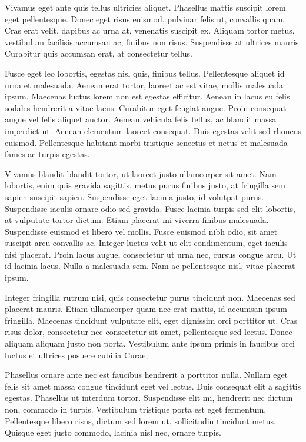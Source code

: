 \documentclass{amsbook}
\begin{document}
Vivamus eget ante quis tellus ultricies aliquet. Phasellus mattis suscipit lorem eget pellentesque. Donec eget risus euismod, pulvinar felis ut, convallis quam. Cras erat velit, dapibus ac urna at, venenatis suscipit ex. Aliquam tortor metus, vestibulum facilisis accumsan ac, finibus non risus. Suspendisse at ultrices mauris. Curabitur quis accumsan erat, at consectetur tellus.

Fusce eget leo lobortis, egestas nisl quis, finibus tellus. Pellentesque aliquet id urna et malesuada. Aenean erat tortor, laoreet ac est vitae, mollis malesuada ipsum. Maecenas luctus lorem non est egestas efficitur. Aenean in lacus eu felis sodales hendrerit a vitae lacus. Curabitur eget feugiat augue. Proin consequat augue vel felis aliquet auctor. Aenean vehicula felis tellus, ac blandit massa imperdiet ut. Aenean elementum laoreet consequat. Duis egestas velit sed rhoncus euismod. Pellentesque habitant morbi tristique senectus et netus et malesuada fames ac turpis egestas.

Vivamus blandit blandit tortor, ut laoreet justo ullamcorper sit amet. Nam lobortis, enim quis gravida sagittis, metus purus finibus justo, at fringilla sem sapien suscipit sapien. Suspendisse eget lacinia justo, id volutpat purus. Suspendisse iaculis ornare odio sed gravida. Fusce lacinia turpis sed elit lobortis, at vulputate tortor dictum. Etiam placerat mi viverra finibus malesuada. Suspendisse euismod et libero vel mollis. Fusce euismod nibh odio, sit amet suscipit arcu convallis ac. Integer luctus velit ut elit condimentum, eget iaculis nisi placerat. Proin lacus augue, consectetur ut urna nec, cursus congue arcu. Ut id lacinia lacus. Nulla a malesuada sem. Nam ac pellentesque nisl, vitae placerat ipsum.

Integer fringilla rutrum nisi, quis consectetur purus tincidunt non. Maecenas sed placerat mauris. Etiam ullamcorper quam nec erat mattis, id accumsan ipsum fringilla. Maecenas tincidunt vulputate elit, eget dignissim orci porttitor ut. Cras risus dolor, consectetur nec consectetur sit amet, pellentesque sed lectus. Donec aliquam aliquam justo non porta. Vestibulum ante ipsum primis in faucibus orci luctus et ultrices posuere cubilia Curae;

Phasellus ornare ante nec est faucibus hendrerit a porttitor nulla. Nullam eget felis sit amet massa congue tincidunt eget vel lectus. Duis consequat elit a sagittis egestas. Phasellus ut interdum tortor. Suspendisse elit mi, hendrerit nec dictum non, commodo in turpis. Vestibulum tristique porta est eget fermentum. Pellentesque libero risus, dictum sed lorem ut, sollicitudin tincidunt metus. Quisque eget justo commodo, lacinia nisl nec, ornare turpis.
\end{document}
